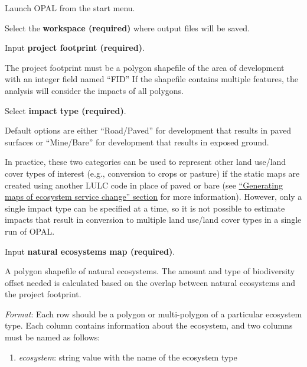 \documentclass[11pt,letterpaper]{report}
\newenvironment{myenumerate}{%
	\edef\backupindent{\the\parindent}
	\enumerate
	\setlength{\parindent}{\backupindent}
		\setlist[enumerate,1]{label=(\arabic*)}
		\setlist[enumerate,2]{label=(\arabic*)}
}{\endenumerate}
\begin{document}
	\begin{myenumerate}
		\item Launch OPAL from the start menu.
		
		\item Select the \textbf{workspace (required)} where output files will be saved.
		
		\item Input \textbf{project footprint (required)}.\

			The project footprint must be a polygon shapefile of the area of development with an integer field named ``FID'' If the shapefile contains multiple features, the analysis will consider the impacts of all polygons.
				
		\item Select \textbf{impact type (required)}.\
		
			Default options are either ``Road/Paved'' for development that results in paved surfaces or ``Mine/Bare'' for development that results in exposed ground.
			
			In practice, these two categories can be used to represent other land use/land cover types of interest (e.g., conversion to crops or pasture) if the static maps are created using another LULC code  in place of paved or bare (see \hyperref[ch:maps]{``Generating maps of ecosystem service change'' section} for more information). However, only a single impact type can be specified at a time, so it is not possible to estimate impacts that result in conversion to multiple land use/land cover types in a single run of OPAL.
		
		\item Input \textbf{natural ecosystems map (required)}.
		
			A polygon shapefile of natural ecosystems. The amount and type of biodiversity offset needed is calculated based on the overlap between natural ecosystems and the project footprint. 
		
			\begin{adjustwidth}{0.25in}{}
				
				{\em Format}: Each row should be a polygon or multi-polygon of a particular ecosystem type. Each column contains information about the ecosystem, and two columns must be named as follows:
			
			\end{adjustwidth}
				
			\begin{enumerate}[leftmargin=0.5in,labelindent=!,itemindent=-0.02in]
				\item {\em ecosystem}: string value with the name of the ecosystem type\
				

\end{enumerate}
\end{myenumerate}
\end{document}

